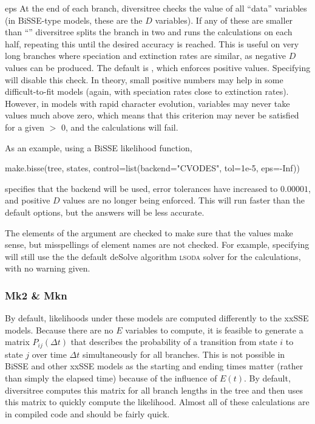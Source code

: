 \documentclass[12pt,twoside]{article}
\newenvironment{cdescription}{\begin{description}[font=\tt,leftmargin=4em,labelindent=2em,noitemsep]\addtolength{\parskip}{.75ex}}{\end{description}}
\newcommand{\dt}{\ensuremath{\Delta t}}
\begin{document}
\begin{cdescription}
\item[eps] At the end of each branch, diversitree checks the value of
  all ``data'' variables (in BiSSE-type models, these are the $D$
  variables).  If any of these are smaller than ``''
  diversitree splits the branch in two and runs the calculations on
  each half, repeating this until the desired accuracy is reached.
  This is useful on very long branches where speciation and extinction
  rates are similar, as negative $D$ values can be produced.  The
  default is , which enforces positive values.  Specifying
   will disable this check.  In theory, small positive
  numbers may help in some difficult-to-fit models (again, with
  speciation rates close to extinction rates).  However, in models
  with rapid character evolution, variables may never take values much
  above zero, which means that this criterion may never be satisfied
  for a given  $>$ 0, and the calculations will fail.
\end{cdescription}

As an example, using a BiSSE likelihood function,
\begin{Schunk}
\begin{Sinput}
make.bisse(tree, states, 
           control=list(backend="CVODES", tol=1e-5, eps=-Inf))
\end{Sinput}
\end{Schunk}
specifies that the  backend will be used, error
tolerances have increased to $0.00001$, and positive $D$ values are no
longer being enforced.  This will run faster than the default options,
but the answers will be less accurate.

The elements of the  argument are checked to make sure
that the values make sense, but misspellings of element names are not
checked.  For example, specifying 
will still use the the default deSolve algorithm \textsc{lsoda} solver
for the calculations, with no warning given.

\subsubsection{Mk2 \& Mkn}
By default, likelihoods under these models are computed differently to
the xxSSE models.  Because there are no $E$ variables to compute, it
is feasible to generate a matrix $P_{ij}(\dt)$ that describes the
probability of a transition from state $i$ to state $j$ over time
$\dt$ simultaneously for all branches.  This is not possible in BiSSE
and other xxSSE models as the starting and ending times matter (rather
than simply the elapsed time) because of the influence of $E(t)$.
%
By default, diversitree computes this matrix for all branch lengths in
the tree and then uses this matrix to quickly compute the likelihood.
Almost all of these calculations are in compiled code and should be
fairly quick.
\end{document}
